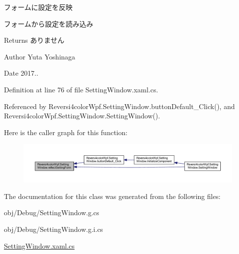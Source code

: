 フォームに設定を反映 

フォームから設定を読み込み

\begin{DoxyReturn}{Returns}
ありません 
\end{DoxyReturn}
\begin{DoxyAuthor}{Author}
Yuta Yoshinaga 
\end{DoxyAuthor}
\begin{DoxyDate}{Date}
2017.. 
\end{DoxyDate}


Definition at line 76 of file Setting\+Window.\+xaml.\+cs.



Referenced by Reversi4color\+Wpf.\+Setting\+Window.\+button\+Default\+\_\+\+Click(), and Reversi4color\+Wpf.\+Setting\+Window.\+Setting\+Window().

Here is the caller graph for this function\+:
\nopagebreak
\begin{figure}[H]
\begin{center}
\leavevmode
\includegraphics[width=350pt]{class_reversi4color_wpf_1_1_setting_window_a768840bbf4baf723e039d187a7ee3def_icgraph}
\end{center}
\end{figure}


The documentation for this class was generated from the following files\+:\begin{DoxyCompactItemize}
\item 
obj/\+Debug/Setting\+Window.\+g.\+cs\item 
obj/\+Debug/Setting\+Window.\+g.\+i.\+cs\item 
\hyperlink{_setting_window_8xaml_8cs}{Setting\+Window.\+xaml.\+cs}\end{DoxyCompactItemize}
